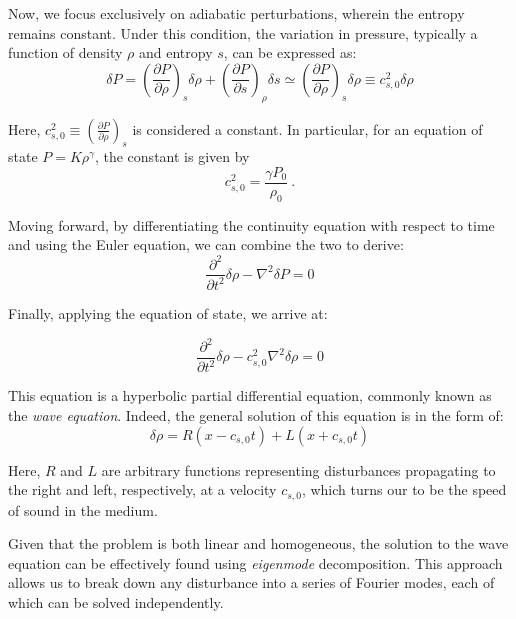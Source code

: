 Now, we focus exclusively on adiabatic perturbations, wherein the entropy remains constant. Under this condition, the variation in pressure, typically a function of density \( \rho \) and entropy \( s \), can be expressed as:
%
\begin{equation}
\delta P = \left( \frac{\partial P}{\partial \rho} \right)_s \delta \rho + \left( \frac{\partial P}{\partial s} \right)_\rho \delta s \simeq \left( \frac{\partial P}{\partial \rho} \right)_s \delta \rho \equiv c_{s,0}^2 \delta \rho
\end{equation}

Here, \( c_{s,0}^2 \equiv  \left( \frac{\partial P}{\partial \rho} \right)_s \) is considered a constant. In particular, for an equation of state \( P = K \rho^\gamma \), the constant is given by 
\begin{equation}\label{eq:cs02}
c_{s,0}^2 = \frac{\gamma P_0}{\rho_0}~.
\end{equation}

Moving forward, by differentiating the continuity equation with respect to time and using the Euler equation, we can combine the two to derive:
%
\begin{equation}
\frac{\partial^2}{\partial t^2} \delta \rho - \nabla^2 \delta P = 0
\end{equation}

Finally, applying the equation of state, we arrive at:
%
\begin{remark}
\begin{equation}
\frac{\partial^2}{\partial t^2} \delta \rho - c_{s,0}^2 \nabla^2 \delta \rho = 0
\end{equation}
\end{remark}

This equation is a hyperbolic partial differential equation, commonly known as the \emph{wave equation}. 
%
Indeed, the general solution of this equation is in the form of:
%
\begin{equation}
\delta \rho = R(x - c_{s,0} t) + L (x + c_{s,0} t)
\end{equation}

Here, \( R \) and \( L \) are arbitrary functions representing disturbances propagating to the right and left, respectively, at a velocity \( c_{s,0} \), which turns our to be the speed of sound in the medium.

Given that the problem is both linear and homogeneous, the solution to the wave equation can be effectively found using \emph{eigenmode} decomposition. This approach allows us to break down any disturbance into a series of Fourier modes, each of which can be solved independently.

